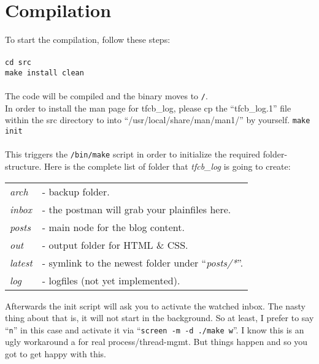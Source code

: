 \section {Compilation}
To start the compilation, follow these steps:\\\\
\texttt{cd src\\ make install clean\\\\}
The code will be compiled and the binary moves to \texttt{/}.
\\
In order to install the man page for tfcb\_log, please cp the ``tfcb\_log.1'' file within the src directory to into ``/usr/local/share/man/man1/'' by yourself.
\newpage
\texttt{make init\\\\}
This triggers the \texttt{/bin/make} script in order to initialize the required folder-structure. 
Here is the complete list of folder that {\em tfcb\_log} is going to create:\\
{\quotation \begin{tabular}{ll}
{\em arch}&- backup folder.\\
{\em inbox}&- the postman will grab your plainfiles here.\\
{\em posts}&- main node for the blog content.\\
{\em out}&- output folder for HTML \& CSS.\\
{\em latest}&- symlink to the newest folder under ``{\em posts/*}''.\\
{\em log}&- logfiles (not yet implemented).
\end{tabular}}
\bigskip\bigskip\newline
Afterwards the init script will ask you to activate the watched inbox. The nasty thing about that is, it will not start in the background. So at least, I prefer to say ``\texttt{n}'' in this case and activate it via ``\texttt{screen -m -d ./make w}''. I know this is an ugly workaround a for real process/thread-mgmt. But things happen and so you got to get happy with this.
\newline
